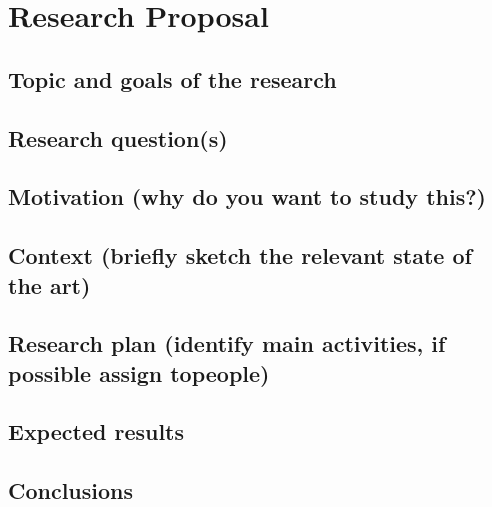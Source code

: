\section{Research Proposal}
\subsection{Topic and goals of the research}
\subsection{Research question(s)}
\subsection{Motivation (why do you want to study this?)}
\subsection{Context (briefly sketch the relevant state of the art)}
\subsection{Research plan (identify main activities, if possible assign topeople)}
\subsection{Expected results}
\subsection{Conclusions}